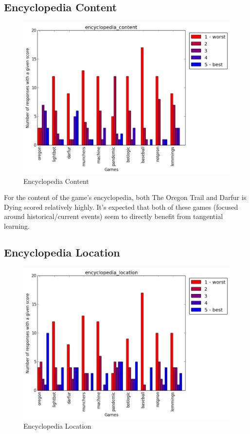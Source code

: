 			\subsection{Encyclopedia Content}
				\begin{figure}[] 
				\centering 
				\includegraphics[width=\textwidth, height=.4\textheight, keepaspectratio=true]{encyclopedia_content_scores.png} 
				\caption{Encyclopedia Content}
				\end{figure}

				For the content of the game's encyclopedia, both The Oregon Trail and Darfur is Dying scored relatively highly. It's expected that both of these games (focused around historical/current events) seem to directly benefit from tangential learning.

			\subsection{Encyclopedia Location}
				\begin{figure}[] 
				\centering 
				\includegraphics[width=\textwidth, height=.4\textheight, keepaspectratio=true]{encyclopedia_location_scores.png} 
				\caption{Encyclopedia Location}
				\end{figure}


